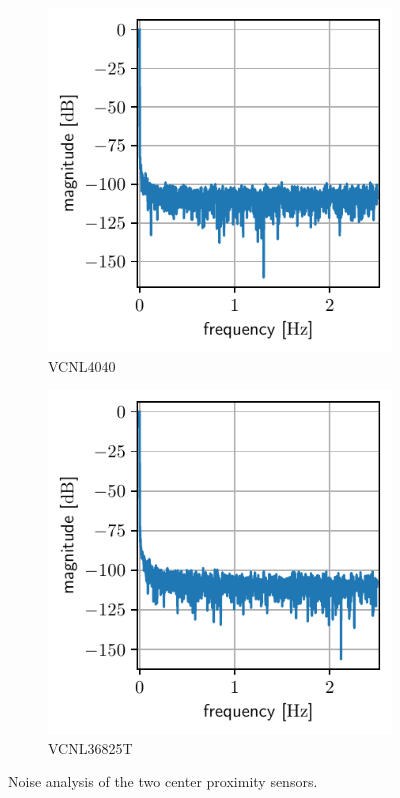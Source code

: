 \begin{figure}[!hb]
    \centering
    \begin{subfigure}{.5\textwidth}
      \centering
      \includegraphics{graphs/noise_prx1.pdf}
      \caption{VCNL4040}
      \label{g:noise_prx1}
    \end{subfigure}%
    \begin{subfigure}{.5\textwidth}
      \centering
      \includegraphics{graphs/noise_prx2.pdf}
      \caption{VCNL36825T}
      \label{g:noise_prx2}
    \end{subfigure}
    \caption{Noise analysis of the two center proximity sensors.}
    \label{g:noise_prx}
\end{figure}


